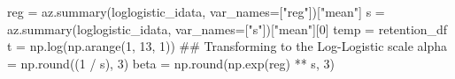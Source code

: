 \documentclass[
  letterpaper,
  DIV=11,
  numbers=noendperiod]{scrartcl}
\newenvironment{Shaded}{\begin{snugshade}}{\end{snugshade}}
\newcommand{\BuiltInTok}[1]{\textcolor[rgb]{0.00,0.23,0.31}{#1}}
\newcommand{\CommentTok}[1]{\textcolor[rgb]{0.37,0.37,0.37}{#1}}
\newcommand{\DecValTok}[1]{\textcolor[rgb]{0.68,0.00,0.00}{#1}}
\newcommand{\NormalTok}[1]{\textcolor[rgb]{0.00,0.23,0.31}{#1}}
\newcommand{\OperatorTok}[1]{\textcolor[rgb]{0.37,0.37,0.37}{#1}}
\newcommand{\StringTok}[1]{\textcolor[rgb]{0.13,0.47,0.30}{#1}}
\begin{document}
\begin{Shaded}
\begin{Highlighting}[]
\NormalTok{reg }\OperatorTok{=}\NormalTok{ az.summary(loglogistic\_idata, var\_names}\OperatorTok{=}\NormalTok{[}\StringTok{"reg"}\NormalTok{])[}\StringTok{"mean"}\NormalTok{]}
\NormalTok{s }\OperatorTok{=}\NormalTok{ az.summary(loglogistic\_idata, var\_names}\OperatorTok{=}\NormalTok{[}\StringTok{"s"}\NormalTok{])[}\StringTok{"mean"}\NormalTok{][}\DecValTok{0}\NormalTok{]}
\NormalTok{temp }\OperatorTok{=}\NormalTok{ retention\_df}
\NormalTok{t }\OperatorTok{=}\NormalTok{ np.log(np.arange(}\DecValTok{1}\NormalTok{, }\DecValTok{13}\NormalTok{, }\DecValTok{1}\NormalTok{))}
\CommentTok{\#\# Transforming to the Log{-}Logistic scale}
\NormalTok{alpha }\OperatorTok{=}\NormalTok{ np.}\BuiltInTok{round}\NormalTok{((}\DecValTok{1} \OperatorTok{/}\NormalTok{ s), }\DecValTok{3}\NormalTok{)}
\NormalTok{beta }\OperatorTok{=}\NormalTok{ np.}\BuiltInTok{round}\NormalTok{(np.exp(reg) }\OperatorTok{**}\NormalTok{ s, }\DecValTok{3}\NormalTok{)}


\end{Highlighting}
\end{Shaded}
\end{document}
